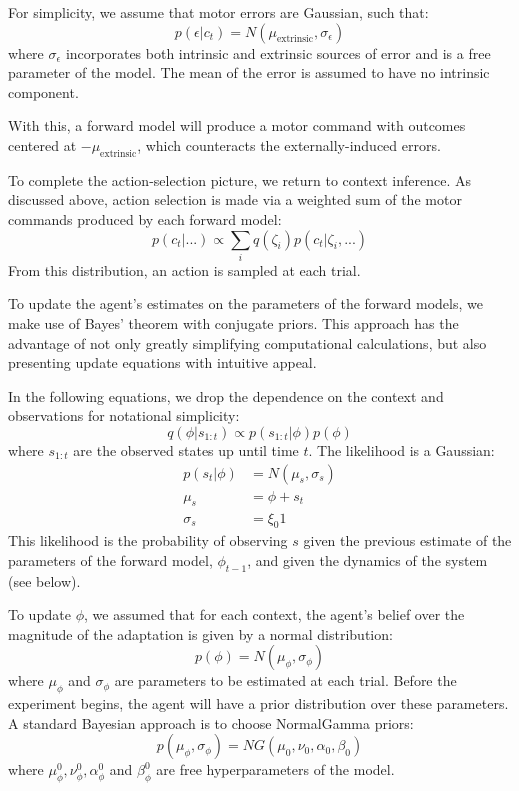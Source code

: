 \documentclass[a4paper,doc,floatsintext,natbib]{apa6}%
\begin{document}
For simplicity, we assume that motor errors are Gaussian, such that:
\begin{equation}
p(\epsilon | c_t) = N(\mu_{\text{extrinsic}}, \sigma_\epsilon)
\end{equation}
where $\sigma_\epsilon$ incorporates both intrinsic and extrinsic sources of
error and is a free parameter of the model. The mean of the error is assumed to
have no intrinsic component.

With this, a forward model will produce a motor command with outcomes centered
at $-\mu_{\text{extrinsic}}$, which counteracts the externally-induced errors.

To complete the action-selection picture, we return to context inference. As
discussed above, action selection is made via a weighted sum of the motor commands
produced by each forward model:
\begin{equation}
p(c_t | ...) \propto \displaystyle \sum_{i} q(\zeta_i)p(c_t | \zeta_i, ...) \label{eqn:dist-comm}
\end{equation}
From this distribution, an action is sampled at each trial.

To update the agent's estimates on the parameters of the forward models, we
make use of Bayes' theorem with conjugate priors. This approach has the
advantage of not only greatly simplifying computational calculations, but also
presenting update equations with intuitive appeal.

In the following equations, we drop the dependence on the context and
observations for notational simplicity:
\begin{equation}
q(\phi | s_{1:t}) \propto p(s_{1:t} | \phi)p(\phi)
\end{equation}
where $s_{1:t}$ are the observed states up until time $t$. The likelihood is a
Gaussian:
\begin{align}
  p(s_t | \phi) &= N(\mu_s, \sigma_s)  \\
  \mu_s &= \phi + s_t \\
  \sigma_s &= \xi_0 1
\end{align}
This likelihood is the probability of observing $s$ given the previous estimate
of the parameters of the forward model, $\phi_{t-1}$, and given the dynamics of
the system (see below).

To update $\phi$, we assumed that for each context, the agent's belief over
the magnitude of the adaptation is given by a normal distribution:
\begin{equation}
p(\phi) = N(\mu_\phi, \sigma_\phi) \label{eqn:data-dist}
\end{equation}
where $\mu_\phi$ and $\sigma_\phi$ are parameters to be estimated at each
trial. Before the experiment begins, the agent will have a prior distribution
over these parameters. A standard Bayesian approach is to choose NormalGamma
priors:
\begin{equation}
p(\mu_\phi, \sigma_\phi) = NG(\mu_0, \nu_0, \alpha_0, \beta_0)
\end{equation}
where $\mu_{\phi}^0, \nu_{\phi}^0, \alpha_{\phi}^0$ and $\beta_{\phi}^0$ are free
hyperparameters of the model.
\end{document}
